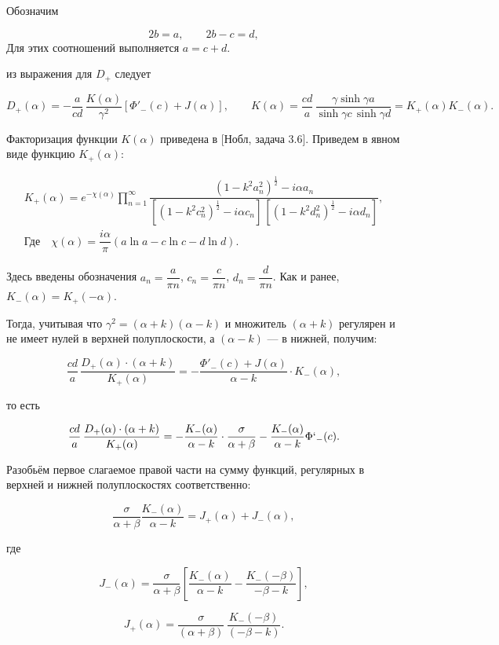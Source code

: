 \documentclass[a4paper,12pt]{article}
\begin{document}
Обозначим

\[
2b=a,
\qquad
2b-c=d,
\]
Для этих соотношений выполняется $a = c+d$.

из выражения для $D_+$ следует

\[
D_+(\alpha)
=
-\frac{a}{cd}\,\dfrac{K(\alpha)}{\gamma^2}
\left[
\Phi'_-(c)+J(\alpha)
\right],
\qquad
K(\alpha)
=
\frac{cd}{a}\, \frac{\gamma\sinh\gamma a }{\sinh\gamma c\, \sinh\gamma d } = K_+(\alpha)K_-(\alpha).
\]

Факторизация функции $K(\alpha)$ приведена в [Нобл, задача 3.6]. Приведем в явном виде функцию $K_+(\alpha):$

\begin{gather}
K_+(\alpha)
=
e^{-\chi(\alpha)} \prod_{n=1}^{\infty}
\dfrac{(1 - k^2a_n^2)^{\frac{1}{2}} - i \alpha a_n}
{\left[(1- k^2 c_n^2)^{\frac{1}{2}} - i\alpha c_n\right]\, \left[ (1- k^2 d_n^2)^{\frac{1}{2}} - i\alpha d_n \right]}, \\
\text{Где} \quad \chi(\alpha) = \dfrac{i\alpha}{\pi}(a \ln{a} - c \ln c - d \ln d).
\end{gather}

Здесь введены обозначения $a_n = \dfrac{a}{\pi n}$, $c_n = \dfrac{c}{\pi n}$, $d_n = \dfrac{d}{\pi n}$. Как и ранее, $K_-(\alpha) = K_+(-\alpha)$.

Тогда, учитывая что $\gamma^2 = (\alpha + k)(\alpha - k)$ и множитель $(\alpha + k)$ регулярен и не имеет нулей в верхней полуплоскости, а $(\alpha - k)$ --- в нижней, получим:

\[
\frac{cd}{a}\,\dfrac{D_+(\alpha)\cdot (\alpha + k)}{K_+(\alpha)}
=
-
\frac{\Phi'_-(c)+J(\alpha)}{\alpha - k} \cdot K_-(\alpha),
\]

то есть

\[
\frac{cd}{a}\,\dfrac{D_+(\alpha)\cdot (\alpha + k)}{K_+(\alpha)}
=
-
\dfrac{K_-(\alpha)}{\alpha - k} \cdot \dfrac{\sigma}{\alpha + \beta}
-
\frac{K_-(\alpha)}{\alpha - k} \Phi`_-(c).
\]

Разобьём первое слагаемое правой части на сумму функций, регулярных в верхней и нижней полуплоскостях соответственно:

\[
\dfrac{\sigma}{\alpha + \beta} \frac{K_-(\alpha)}{\alpha - k}
=
J_+(\alpha)
+
J_-(\alpha),
\]

где

\[
J_-(\alpha)
=
\frac{\sigma}
{\alpha+\beta}
\left[
\frac{K_-(\alpha)}{\alpha - k}-\frac{K_-(-\beta)}{- \beta - k}
\right],
\]

\[
J_+(\alpha)
=
\frac{\sigma}
{(\alpha+\beta)}\,\dfrac{K_-(-\beta)}{(- \beta - k)}.
\]
\end{document}
